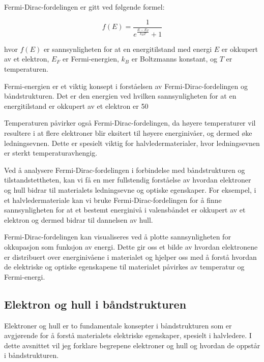 Fermi-Dirac-fordelingen er gitt ved følgende formel:

\begin{equation*}
f(E) = \frac{1}{e^{\frac{E - E_F}{k_B T}} + 1}
\end{equation*}

hvor $f(E)$ er sannsynligheten for at en energitilstand med energi $E$ er okkupert av et elektron, $E_F$ er Fermi-energien, $k_B$ er Boltzmanns konstant, og $T$ er temperaturen.

Fermi-energien er et viktig konsept i forståelsen av Fermi-Dirac-fordelingen og båndstrukturen. Det er den energien ved hvilken sannsynligheten for at en energitilstand er okkupert av et elektron er 50 %

Temperaturen påvirker også Fermi-Dirac-fordelingen, da høyere temperaturer vil resultere i at flere elektroner blir eksitert til høyere energinivåer, og dermed øke ledningsevnen. Dette er spesielt viktig for halvledermaterialer, hvor ledningsevnen er sterkt temperaturavhengig.

Ved å analysere Fermi-Dirac-fordelingen i forbindelse med båndstrukturen og tilstandstettheten, kan vi få en mer fullstendig forståelse av hvordan elektroner og hull bidrar til materialets ledningsevne og optiske egenskaper. For eksempel, i et halvledermateriale kan vi bruke Fermi-Dirac-fordelingen for å finne sannsynligheten for at et bestemt energinivå i valensbåndet er okkupert av et elektron og dermed bidrar til dannelsen av hull.

Fermi-Dirac-fordelingen kan visualiseres ved å plotte sannsynligheten for okkupasjon som funksjon av energi. Dette gir oss et bilde av hvordan elektronene er distribuert over energinivåene i materialet og hjelper oss med å forstå hvordan de elektriske og optiske egenskapene til materialet påvirkes av temperatur og Fermi-energi.

\subsection*{Elektron og hull i båndstrukturen}

Elektroner og hull er to fundamentale konsepter i båndstrukturen som er avgjørende for å forstå materialets elektriske egenskaper, spesielt i halvledere. I dette avsnittet vil jeg forklare begrepene elektroner og hull og hvordan de oppstår i båndstrukturen.

